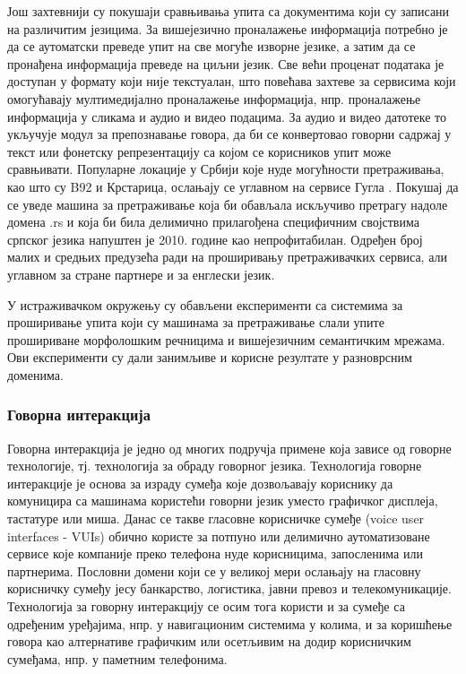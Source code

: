 \begin{multicols}{2}

Још захтевнији су покушаји сравњивања упита са документима који су записани на различитим језицима. За вишејезично проналажење информација потребно је да се аутоматски преведе упит на све могуће изворне језике, а затим да се пронађена информација преведе на циљни језик. Све већи проценат података је доступан у формату који није текстуалан, што повећава захтеве за сервисима који омогућавају мултимедијално проналажење информација, нпр. проналажење информација у сликама и аудио и видео подацима. За аудио и видео датотеке то укључује модул за препознавање говора, да би се конвертовао говорни садржај у текст или фонетску репрезентацију са којом се корисников упит може сравњивати. Популарне локације у Србији које нуде могућности претраживања, као што су B92 и Крстарица, ослањају се углавном на сервисе Гугла \cite{ALEXA}. Покушај да се уведе машина за претраживање која би обављала искључиво претрагу надоле домена .rs и која би била делимично прилагођена специфичним својствима српског језика напуштен је 2010. године као непрофитабилан. Одређен број малих и средњих предузећа ради на проширивању претраживачких сервиса, али углавном за стране партнере и за енглески језик. 

У истраживачком окружењу су обављени експерименти са системима за проширивање упита који су машинама за претраживање слали упите прошириване морфолошким речницима и вишејезичним семантичким мрежама. Ови експерименти су дали занимљиве и корисне резултате у разноврсним доменима. 

 \subsubsection {Говорна интеракција}
   
Говорна интеракција је једно од многих подручја примене која зависе од говорне технологије, тј. технологија за обраду говорног језика. Технологија говорне интеракције је основа за израду сумеђа  које дозвољавају кориснику да комуницира са машинама користећи говорни језик уместо графичког дисплеја, тастатуре или миша. Данас се такве гласовне корисничке сумеђе (voice user interfaces - VUIs) обично користе за потпуно или делимично аутоматизоване сервисе које компаније преко телефона нуде корисницима, запосленима или партнерима. Пословни домени који се у великој мери ослањају на гласовну корисничку сумеђу јесу банкарство, логистика, јавни превоз и телекомуникације. Технологија за говорну интеракцију се осим тога користи и за сумеђе са одређеним уређајима, нпр. у навигационим системима у колима, и за коришћење говора као алтернативе графичким или осетљивим на додир корисничким сумеђама, нпр. у паметним телефонима. 


\end{multicols}
